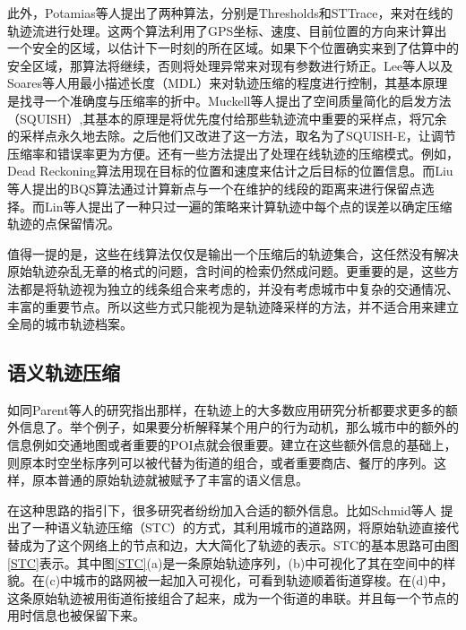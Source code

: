 此外，Potamias等人提出了两种算法，分别是Thresholds和STTrace，来对在线的轨迹流进行处理。这两个算法利用了GPS坐标、速度、目前位置的方向来计算出一个安全的区域，以估计下一时刻的所在区域。如果下个位置确实来到了估算中的安全区域，那算法将继续，否则将处理异常来对现有参数进行矫正。Lee等人以及Soares等人用最小描述长度（MDL）来对轨迹压缩的程度进行控制，其基本原理是找寻一个准确度与压缩率的折中。Muckell等人提出了空间质量简化的启发方法（SQUISH）,其基本的原理是将优先度付给那些轨迹流中重要的采样点，将冗余的采样点永久地去除。之后他们又改进了这一方法，取名为了SQUISH-E，让调节压缩率和错误率更为方便。还有一些方法提出了处理在线轨迹的压缩模式。例如，Dead Reckoning算法用现在目标的位置和速度来估计之后目标的位置信息。而Liu等人提出的BQS算法通过计算新点与一个在维护的线段的距离来进行保留点选择。而Lin等人提出了一种只过一遍的策略来计算轨迹中每个点的误差以确定压缩轨迹的点保留情况。

值得一提的是，这些在线算法仅仅是输出一个压缩后的轨迹集合，这任然没有解决原始轨迹杂乱无章的格式的问题，含时间的检索仍然成问题。更重要的是，这些方法都是将轨迹视为独立的线条组合来考虑的，并没有考虑城市中复杂的交通情况、丰富的重要节点。所以这些方式只能视为是轨迹降采样的方法，并不适合用来建立全局的城市轨迹档案。


\subsection{语义轨迹压缩}
如同Parent等人的研究指出那样，在轨迹上的大多数应用研究分析都要求更多的额外信息了。举个例子，如果要分析解释某个用户的行为动机，那么城市中的额外的信息例如交通地图或者重要的POI点就会很重要。建立在这些额外信息的基础上，则原本时空坐标序列可以被代替为街道的组合，或者重要商店、餐厅的序列。这样，原本普通的原始轨迹就被赋予了丰富的语义信息。



在这种思路的指引下，很多研究者纷纷加入合适的额外信息。比如Schmid等人 提出了一种语义轨迹压缩（STC）的方式，其利用城市的道路网，将原始轨迹直接代替成为了这个网络上的节点和边，大大简化了轨迹的表示。STC的基本思路可由图\ref{STC}表示。其中图\ref{STC}(a)是一条原始轨迹序列，(b)中可视化了其在空间中的样貌。在(c)中城市的路网被一起加入可视化，可看到轨迹顺着街道穿梭。在(d)中，这条原始轨迹被用街道衔接组合了起来，成为一个街道的串联。并且每一个节点的用时信息也被保留下来。


